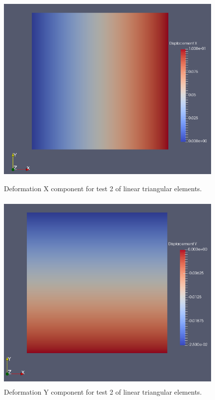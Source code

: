\documentclass[a4paper, 12pt]{article}
\begin{document}
\begin{figure}[H]
  \centering
  \includegraphics[width=13cm, height=10cm]{tri_4_t2_disp_X}
  \caption{Deformation X component for test 2 of linear 
            triangular elements.}
  \label{fig:linTri2_x}
\end{figure}

\begin{figure}[H]
  \centering
  \includegraphics[width=13cm, height=10cm]{tri_4_t2_disp_Y}
  \caption{Deformation Y component for test 2 of linear 
            triangular elements.}
  \label{fig:linTri2_y}
\end{figure}
\end{document}
